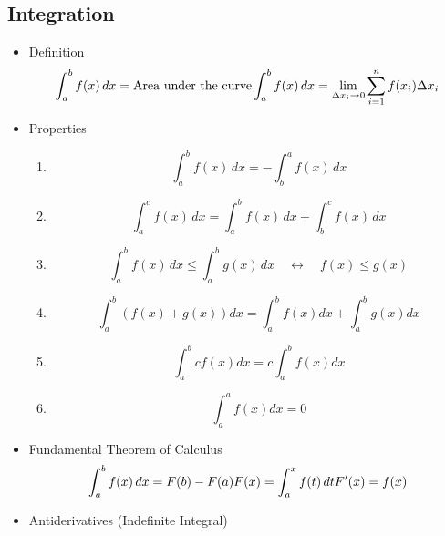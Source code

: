 \subsection{Integration}
	\begin{itemize}
		\item Definition
			\begin{equation}
				\int_a^b f(x) \, dx = \textrm{Area under the curve} \\
				\int_a^b f(x) \, dx = \lim_{\Delta x_i \rightarrow 0} \sum_{i=1}^n f(x_i) \Delta x_i
			\end{equation}
		\item Properties
			\begin{enumerate}
				\item
					\begin{equation}
						\int_a^b f(x) \, dx = - \int_b^a f(x) \, dx
					\end{equation}
				\item
					\begin{equation}
						\int_a^c f(x) \, dx = \int_a^b f(x) \, dx + \int_b^c f(x) \, dx
					\end{equation}
				\item
					\begin{equation}
						\int_a^b f(x) \, dx \leq \int_a^b g(x) \, dx \quad \leftrightarrow \quad f(x) \leq g(x)
					\end{equation}
				\item
					\begin{equation}
						\int_a^b (f(x) + g(x))dx = \int_a^b f(x) dx + \int_a^b g(x) dx
					\end{equation}
				\item
					\begin{equation}
						\int_a^b cf(x)dx = c \int_a^b f(x) dx
					\end{equation}
				\item
					\begin{equation}
						\int_a^a f(x) dx = 0
					\end{equation}
			\end{enumerate}
		\item Fundamental Theorem of Calculus
			\begin{equation}
				\int_a^b f(x) \, dx = F(b)-F(a) \\
				F(x)=\int_a^x f(t) \, dt \\
				F'(x)=f(x)
			\end{equation}
		\item Antiderivatives (Indefinite Integral)

\end{itemize}
